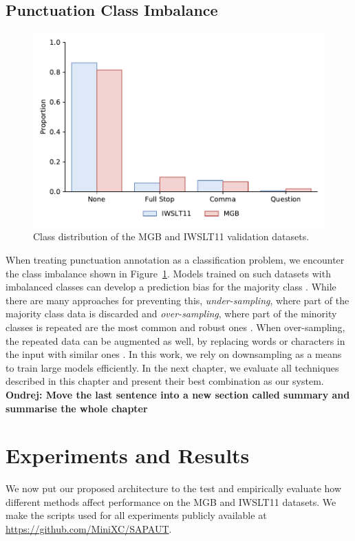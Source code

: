 \documentclass[bsc,deptreport,ai]{infthesis} %
\newcommand{\Ondrej}[1]{{\color{red} \textbf{Ondrej: #1}}}
\begin{document}
\section{Punctuation Class Imbalance}
\begin{figure}[!htb]
\centering
\includegraphics[width=.6\textwidth]{classimbalance.pdf}
\caption{Class distribution of the MGB and IWSLT11 validation datasets.}
\label{fig:classdist}
\end{figure}
When treating punctuation annotation as a classification problem, we encounter the class imbalance shown in Figure~\ref{fig:classdist}. Models trained on such datasets with imbalanced classes can develop a prediction bias for the majority class \citep{imbalance}. While there are many approaches for preventing this, \emph{under-sampling}, where part of the majority class data is discarded and \emph{over-sampling}, where part of the minority classes is repeated are the most common and robust ones \citep{imbalance}. When over-sampling, the repeated data can be augmented as well, by replacing words or characters in the input with similar ones \citep{ma2019nlpaug}. In this work, we rely on downsampling as a means to train large models efficiently. In the next chapter, we evaluate all techniques described in this chapter and present their best combination as our system.
\Ondrej{Move the last sentence into a new section called summary and summarise the whole chapter}


\chapter{Experiments and Results}
We now put our proposed architecture to the test and empirically evaluate how different methods affect performance on the MGB and IWSLT11 datasets. We make the scripts used for all experiments publicly available at \url{https://github.com/MiniXC/SAPAUT}.
\end{document}
